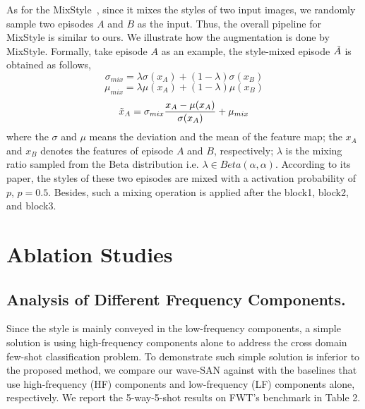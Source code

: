 \documentclass{article}
\begin{document}
As for the MixStyle~\cite{zhou2021domain}, since it mixes the styles of two input images, we randomly sample two episodes $A$ and $B$ as the input. Thus, the overall pipeline for MixStyle is similar to ours. We illustrate how the augmentation is done by MixStyle. Formally, take episode $A$ as an example, the style-mixed episode $\Tilde{A}$ is obtained as follows,
	\begin{equation}
	\sigma_{mix} = \lambda \sigma(x_A) + (1-\lambda) \sigma(x_B)
	\end{equation}
	\begin{equation}
	\mu_{mix} = \lambda \mu(x_A) + (1-\lambda) \mu(x_B)
	\end{equation}
	\begin{equation}
	\Tilde{x}_{A} = \sigma_{mix}\frac{x_{A}-\mu(x_{A})}{\sigma(x_{A})} + \mu_{mix}
	\end{equation}
	where the $\sigma$ and $\mu$ means the deviation and the mean of the feature map; the $x_A$ and $x_B$ denotes the features of episode $A$ and $B$, respectively; $\lambda$ is the mixing ratio sampled from the Beta distribution i.e. $\lambda \in Beta(\alpha, \alpha)$. 
	According to its paper, the styles of these two episodes are mixed with a activation probability of $p$, $p=0.5$. Besides, such a mixing operation is applied after the block1, block2, and block3. 

	


\section{Ablation Studies}
\subsection{Analysis of Different Frequency Components.} 
Since the style is mainly conveyed in the low-frequency components, a simple solution is using high-frequency components alone to address the cross domain few-shot classification problem. To demonstrate such simple solution is inferior to the proposed method, we compare our wave-SAN against with the baselines that use high-frequency (HF) components and low-frequency (LF) components alone, respectively. We report the 5-way-5-shot results on FWT's benchmark in Table 2. 
\end{document}
